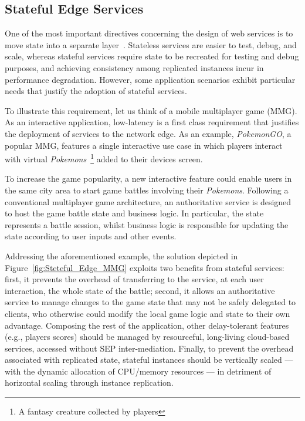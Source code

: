\subsection{Stateful Edge Services}

One of the most important directives concerning the design of web services is to move state into a separate layer~\cite{Armbrust:2010}. Stateless services are easier to test, debug, and scale, whereas stateful services require state to be recreated for testing and debug purposes, and achieving consistency among replicated instances incur in performance degradation. However, some application scenarios exhibit particular needs that justify the adoption of stateful services.


To illustrate this requirement, let us think of a mobile multiplayer game (MMG). As an interactive application, low-latency is a first class requirement that justifies the deployment of services to the network edge. As an example, \textit{PokemonGO}, a popular MMG, features a single interactive use case in which players interact with virtual \textit{Pokemons}~\footnote{A fantasy creature collected by players} added to their devices screen. 
%

To increase the game popularity, a new interactive feature could enable users in the same city area to start game battles involving their \textit{Pokemons}. Following a conventional multiplayer game architecture, an authoritative service is designed to host the game battle state and business logic. In particular, the state represents a battle session, whilst business logic is responsible for updating the state according to user inputs and other events. 

Addressing the aforementioned example, the solution depicted in Figure~\ref{fig:Steteful_Edge_MMG} exploits two benefits from stateful services: first, it prevents the overhead of transferring to the service, at each user interaction, the whole state of the battle; second, it allows an authoritative service to manage changes to the game state that may not be safely delegated to clients, who otherwise could modify the local game logic and state to their own advantage.
Composing the rest of the application, other delay-tolerant features (e.g., players scores) should be managed by resourceful, long-living cloud-based services, accessed without SEP inter-mediation. Finally, to prevent the overhead associated with replicated state, stateful instances should be vertically scaled --- with the dynamic allocation of CPU/memory resources --- in detriment of horizontal scaling through instance replication. %

